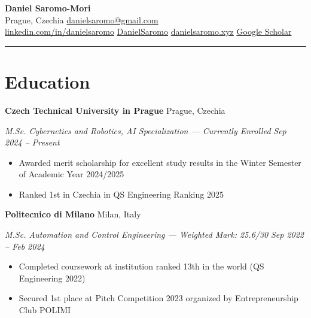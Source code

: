 \documentclass[11pt,letterpaper]{article}
\newcommand{\entry}[4]{%
  \noindent\textbf{#1} \hfill #2 \par\nopagebreak
  \textit{#3} \hfill \textit{#4} \par\nopagebreak
}
\begin{document}
\begin{center}
  {\LARGE\bfseries Daniel Saromo-Mori} \\[4pt]
  \enspace Prague, Czechia
  \quad{}\enspace \href{mailto:danielsaromo@gmail.com}{danielsaromo@gmail.com}
  \\[2pt]
  \enspace \href{https://linkedin.com/in/danielsaromo}{linkedin.com/in/danielsaromo}
  \quad{}\enspace \href{https://github.com/DanielSaromo}{DanielSaromo}
  \quad{}\enspace \href{https://danielsaromo.xyz}{danielsaromo.xyz}
  \quad{}\enspace \href{https://scholar.google.com/citations?user=ym6OfSgAAAAJ}{Google Scholar}
\end{center}

\vspace{-0.4em}
\noindent\rule{\textwidth}{0.8pt}
\vspace{-0.8em}

\section{Education}

\entry{Czech Technical University in Prague}{Prague, Czechia}{M.Sc. Cybernetics and Robotics, AI Specialization --- Currently Enrolled}{Sep 2024 -- Present}
\begin{itemize}
  \item Awarded merit scholarship for excellent study results in the Winter Semester of Academic Year 2024/2025
  \item Ranked 1st in Czechia in QS Engineering Ranking 2025
\end{itemize}
\vspace{0.3em}

\entry{Politecnico di Milano}{Milan, Italy}{M.Sc. Automation and Control Engineering --- Weighted Mark: 25.6/30}{Sep 2022 -- Feb 2024}
\begin{itemize}
  \item Completed coursework at institution ranked 13th in the world (QS Engineering 2022)
  \item Secured 1st place at Pitch Competition 2023 organized by Entrepreneurship Club POLIMI
\end{itemize}
\vspace{0.3em}
\end{document}
